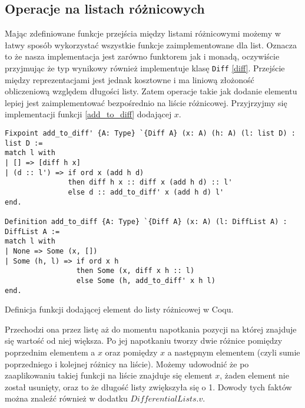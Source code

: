 \subsection{Operacje na listach różnicowych}
Mając zdefiniowane funkcje przejścia między listami różnicowymi możemy w łatwy sposób wykorzystać wszystkie funkcje zaimplementowane dla list. Oznacza to że nasza implementacja jest zarówno funktorem jak i monadą, oczywiście przyjmując że typ wynikowy również implementuje klasę \texttt{Diff} \ref{diff}. Przejście między reprezentacjami jest jednak kosztowne i ma liniową złożoność obliczeniową względem długości listy. Zatem operacje takie jak dodanie elementu lepiej jest zaimplementować bezpośrednio na liście różnicowej. Przyjrzyjmy się implementacji funkcji \ref{add_to_diff} dodającej $x$.
\begin{code}
\begin{verbatim}
Fixpoint add_to_diff' {A: Type} `{Diff A} (x: A) (h: A) (l: list D) : list D :=
match l with
| [] => [diff h x]
| (d :: l') => if ord x (add h d)
               then diff h x :: diff x (add h d) :: l'
               else d :: add_to_diff' x (add h d) l'
end.

Definition add_to_diff {A: Type} `{Diff A} (x: A) (l: DiffList A) : DiffList A :=
match l with
| None => Some (x, [])
| Some (h, l) => if ord x h
                 then Some (x, diff x h :: l)
                 else Some (h, add_to_diff' x h l)
end.
\end{verbatim}
\caption{Definicja funkcji dodającej element do listy różnicowej w Coqu.}
\label{add_to_diff}
\end{code}
Przechodzi ona przez listę aż do momentu napotkania pozycji na której znajduje się wartość od niej większa. Po jej napotkaniu tworzy dwie różnice pomiędzy poprzednim elementem a $x$ oraz pomiędzy $x$ a następnym elementem (czyli sumie poprzedniego i kolejnej różnicy na liście). Możemy udowodnić że po zaaplikowaniu takiej funkcji na liście znajduje się element $x$, żaden element nie został usunięty, oraz to że długość listy zwiększyła się o 1. Dowody tych faktów można znaleźć również w dodatku $DifferentialLists.v$.